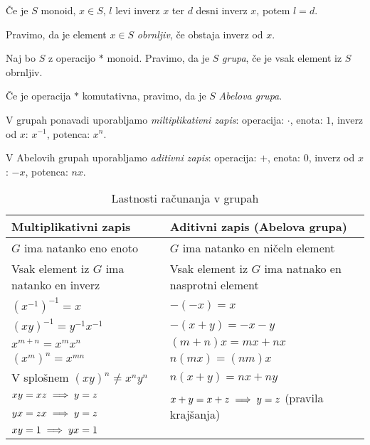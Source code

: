 \begin{trditev}
    Če je $S$ monoid, $x \in S$, $l$ levi inverz $x$ ter $d$ desni inverz $x$, potem $l=d$.
\end{trditev}

\begin{definicija}
    Pravimo, da je element $x \in S$ \emph{obrnljiv}, če obstaja inverz od $x$.
\end{definicija}

\begin{definicija}
    Naj bo $S$ z operacijo $*$ monoid. Pravimo, da je $S$ \emph{grupa}, če je vsak element iz $S$ obrnljiv.

    Če je operacija $*$ komutativna, pravimo, da je $S$ \emph{Abelova grupa}.
\end{definicija}

V grupah ponavadi uporabljamo \emph{miltiplikativni zapis}: operacija: $\cdot$, enota: $1$, inverz od $x$: $x^{-1}$, potenca: $x^n$.

V Abelovih grupah uporabljamo \emph{aditivni zapis}: operacija: $+$, enota: $0$, inverz od $x$: $-x$, potenca: $nx$.

\begin{table}[h!]
    \begin{tabular}{ m{23em} | m{23em} }
        Multiplikativni zapis & Aditivni zapis (Abelova grupa) \\ \hline
        $G$ ima natanko eno enoto & $G$ ima natanko en ničeln element \\ \hline
        Vsak element iz $G$ ima natanko en inverz & Vsak element iz $G$ ima natnako en nasprotni element  \\  \hline
        $(x^{-1})^{-1} = x$ & $-(-x) = x$ \\ \hline
        $(xy)^{-1} = y^{-1}x^{-1}$ & $-(x+y) = -x - y$ \\ \hline
        $x^{m+n} = x^mx^n$ & $(m+n)x = mx + nx$ \\ \hline
        $(x^m)^n = x^{mn}$ & $n(mx) = (nm)x$ \\ \hline
        V splošnem $(xy)^n \neq x^ny^n$ & $n(x+y) = nx + ny$ \\ \hline
        $xy=xz \implies y=z$ & \multirow{2}{20em}{$x+y = x + z \implies y = z$ (pravila krajšanja)} \\ 
        $yx=zx \implies y=z$ & \\ \hline
        $xy=1 \implies yx =1$ & \\
    \end{tabular}
    \caption{Lastnosti računanja v grupah}
\end{table}

